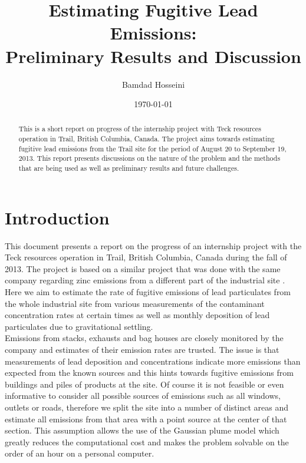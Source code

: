 \documentclass[11pt]{article}
\title{Estimating Fugitive Lead Emissions: \\ Preliminary 
Results and Discussion }
\author{Bamdad Hosseini}
\date{\today}
\begin{document}
\maketitle

\begin{abstract}
  This is a short report on progress of the internship project with 
Teck resources operation in Trail, British Columbia, Canada. The project
aims towards estimating fugitive lead emissions from the Trail site 
for the period of August 20 to September 19, 2013. This report presents 
discussions on the nature of the problem and the methods that are being 
used as well as preliminary results and future challenges.
\end{abstract}

\pagebreak

\section{Introduction}
This document presents a report on the progress of an internship project 
with the Teck resources operation in Trail, British Columbia, Canada during 
the fall of 2013. The project is based on a similar project that was done 
with the same company regarding zinc emissions from a different part of the 
industrial site \cite{stockie2010inverse}. Here we aim to estimate the 
rate of fugitive emissions of lead particulates from the whole industrial 
site from various measurements of the contaminant concentration rates at 
certain times as well as monthly deposition of lead particulates due to 
gravitational settling.\\ 

 Emissions from stacks, exhausts and bag houses 
are closely monitored by the company and estimates of their emission rates 
are trusted. The issue is that measurements of lead deposition and concentrations
indicate more emissions than expected from  the known sources and 
this hints towards fugitive emissions from buildings and piles of 
products at the site. Of course it is not feasible or even informative to 
consider all possible sources of emissions such as all windows, outlets or 
roads, therefore we split the site into a number of distinct areas
and estimate all emissions from that area with a point source at the center 
of that section. This assumption allows the use of the Gaussian plume model
\cite{stockie2011siam} which greatly reduces the computational cost and makes 
the problem solvable on the order of an hour on a personal computer.\\
\end{document}
